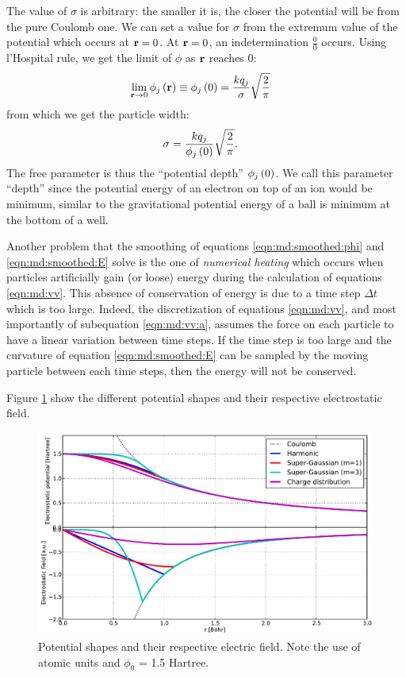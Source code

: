 The value of $\sigma$ is arbitrary: the smaller it is, the closer the potential
will be from the pure Coulomb one. We can set a value for $\sigma$ from the
extremum value of the potential which occurs at $\textbf{r} = 0$. At $\textbf{r} = 0$, an
indetermination $\frac{0}{0}$ occurs. Using l'Hospital rule, we get the limit
of $\phi$ as $\textbf{r}$ reaches 0:
\begin{align}
\lim_{\textbf{r} \rightarrow 0} \phi_j\left( \textbf{r} \right)
    & \equiv \phi_j\left( 0 \right) = \frac{ k q_j }{ \sigma } \sqrt{\frac{2}{\pi}}
\end{align}
from which we get the particle width:
\begin{align}
\sigma & = \frac{ k q_j }{ \phi_j\left( 0 \right) } \sqrt{ \frac{2}{\pi}}.
\label{eqn:md:sigma}
\end{align}
The free parameter is thus the ``potential depth'' $\phi_j\left( 0 \right)$. We call this
parameter ``depth'' since the potential energy of an electron on top of an ion
would be minimum, similar to the gravitational potential energy of a ball is
minimum at the bottom of a well.

Another problem that the smoothing of equations \eqref{eqn:md:smoothed:phi} and
\eqref{eqn:md:smoothed:E} solve is the one of \textit{numerical heating} which
occurs when particles artificially gain (or loose) energy during the
calculation of equations \eqref{eqn:md:vv}. This absence of conservation of
energy is due to a time step $\Delta t$ which is too large. Indeed, the
discretization of equations \eqref{eqn:md:vv}, and most importantly of
subequation \eqref{eqn:md:vv:a}, assumes the force on each particle to have a
linear variation between time steps. If the time step is too large and the
curvature of equation \eqref{eqn:md:smoothed:E} can be sampled by the moving
particle between each time steps, then the energy will not be conserved.



Figure \ref{fig:potential:shapes} show the different potential shapes and their
respective electrostatic field.

\begin{figure}
    \begin{center}
\includegraphics[width=0.98\columnwidth]{figures/potential_shapes}
    \end{center}
    \caption{\label{fig:potential:shapes}Potential shapes and their respective
electric field. Note the use of atomic units and $\phi_0$ = 1.5 Hartree.}
\end{figure}


